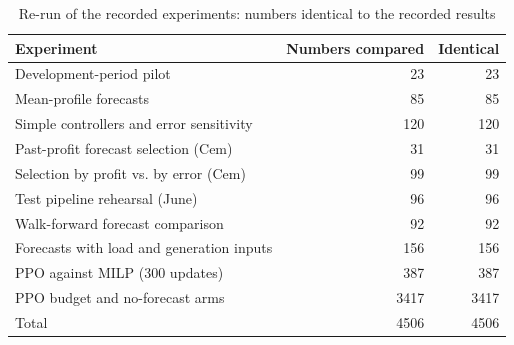 \begin{table}[ht]
  \centering
  \caption{Re-run of the recorded experiments: numbers identical to the recorded results}\label{tab:reproduction}
  \begin{tabular}{lrr}
    \hline
    Experiment & Numbers compared & Identical \\
    \hline
    Development-period pilot & 23 & 23 \\
    Mean-profile forecasts & 85 & 85 \\
    Simple controllers and error sensitivity & 120 & 120 \\
    Past-profit forecast selection (Cem) & 31 & 31 \\
    Selection by profit vs. by error (Cem) & 99 & 99 \\
    Test pipeline rehearsal (June) & 96 & 96 \\
    Walk-forward forecast comparison & 92 & 92 \\
    Forecasts with load and generation inputs & 156 & 156 \\
    PPO against MILP (300 updates) & 387 & 387 \\
    PPO budget and no-forecast arms & 3417 & 3417 \\
    \hline
    Total & 4506 & 4506 \\
    \hline
  \end{tabular}
\end{table}
